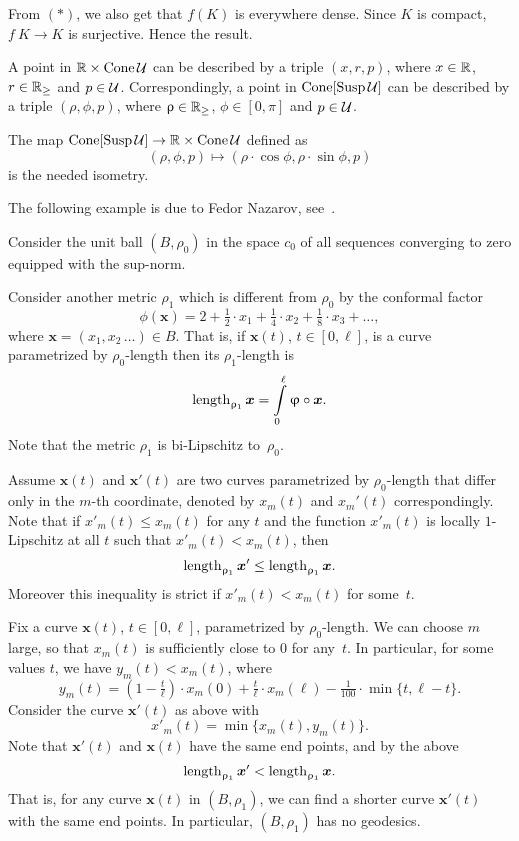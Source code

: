 From $({*})$, we also get that $f(K)$ is everywhere dense.
Since $K$ is compact, $f\:K\to K$ is surjective.
Hence the result.\qeds


 A point in $\RR\times \Cone \spc{U}$ can be described by a triple $(x,r,p)$, where $x\in \RR$, $r\in \RR_{\ge}$ and $p\in \spc{U}$.
Correspondingly, a point in $\mathop{\rm Cone}\nolimits[\mathop{\rm Susp}\nolimits\mathcal{U}]$ can be described by a triple $(\rho,\phi,p)$, where $\rho\in \RR_\ge$, $\phi\in [0,\pi]$ and $p\in \spc{U}$.

The map 
$\Cone[\Susp\spc{U}]\to\RR\times\Cone\spc{U}$ defined as
\[(\rho,\phi,p)\mapsto(\rho\cdot\cos\phi,\rho\cdot\sin\phi,p)\] 
is the needed isometry.\qeds

The following example is due to Fedor Nazarov, see~\cite{nazarov}.

\medskip

Consider the unit ball $(B,\rho_0)$
in the space $c_0$ of all sequences converging to zero equipped with the sup-norm.

Consider another metric $\rho_1$ which is different from $\rho_0$ by the conformal factor
\[\phi(\bm{x})=2+\tfrac{1}2\cdot x_1+\tfrac{1}4\cdot x_2+\tfrac{1}8\cdot x_3+\dots,\]
where $\bm{x}=(x_1,x_2\,\dots)\in B$.
That is, if $\bm{x}(t)$, $t\in[0,\ell]$, is a curve parametrized by $\rho_0$-length 
then its $\rho_1$-length is 
\[\length_{\rho_1}\bm{x}=\int\limits_0^\ell\phi\circ\bm{x}.\]
Note that the metric $\rho_1$ is bi-Lipschitz to~$\rho_0$.

Assume $\bm{x}(t)$ and $\bm{x}'(t)$ are two curves parametrized by $\rho_0$-length that differ only in the $m$-th coordinate, denoted by $x_m(t)$ and $x_m'(t)$ correspondingly.
Note that if $x'_m(t)\le x_m(t)$ for any $t$ and 
the function $x'_m(t)$ is locally $1$-Lipschitz at all $t$ such that $x'_m(t)< x_m(t)$, then 
\[\length_{\rho_1}\bm{x}'\le \length_{\rho_1}\bm{x}.\]
Moreover this inequality is strict if $x'_m(t)< x_m(t)$ for some~$t$.

Fix a curve $\bm{x}(t)$, $t\in[0,\ell]$, parametrized by  $\rho_0$-length.
We can choose $m$ large, so that $x_m(t)$ is sufficiently close to $0$ for any~$t$.
In particular, for some values $t$, we have $y_m(t)<x_m(t)$, where
\[y_m(t)=(1-\tfrac t\ell)\cdot x_m(0)
+\tfrac t\ell\cdot x_m(\ell)
-\tfrac 1{100}\cdot \min\{t,\ell-t\}.\]
Consider the curve $\bm{x}'(t)$ as above with
\[x'_m(t)=\min\{x_m(t),y_m(t)\}.\]
Note that $\bm{x}'(t)$ and $\bm{x}(t)$ have the same end points, and by the above
\[\mathop{\rm length}\nolimits_{\upvarrho_1}\bm{x}'<\mathop{\rm length}\nolimits_{\upvarrho_1}\bm{x}.\]
That is, for any curve $\bm{x}(t)$ in $(B,\rho_1)$, we can find a shorter curve $\bm{x}'(t)$ with the same end points.
In particular, $(B,\rho_1)$ has no geodesics.
\qeds

